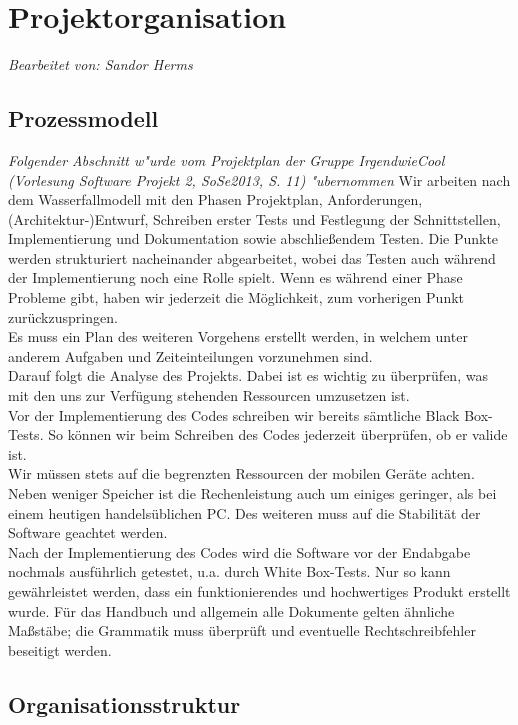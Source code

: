 \section{Projektorganisation}
\textit{Bearbeitet von: Sandor Herms}
\subsection{Prozessmodell}
\textit{Folgender Abschnitt w"urde vom Projektplan der Gruppe IrgendwieCool (Vorlesung Software Projekt 2, SoSe2013, S. 11) "ubernommen}
Wir arbeiten nach dem Wasserfallmodell mit den Phasen Projektplan, Anforderungen, (Architektur-)Entwurf, Schreiben erster Tests und Festlegung der Schnittstellen, Implementierung und Dokumentation sowie abschließendem Testen. Die Punkte werden strukturiert nacheinander abgearbeitet, wobei das Testen auch während der Implementierung noch eine Rolle spielt. Wenn es während einer Phase Probleme gibt, haben wir jederzeit die Möglichkeit, zum vorherigen Punkt zurückzuspringen.\\
Es muss ein Plan des weiteren Vorgehens erstellt werden, in welchem unter anderem Aufgaben und Zeiteinteilungen vorzunehmen sind.\\
Darauf folgt die Analyse des Projekts. Dabei ist es wichtig zu überprüfen, was mit den uns zur Verfügung stehenden Ressourcen umzusetzen ist.\\
Vor der Implementierung des Codes schreiben wir bereits sämtliche Black Box-Tests. So können wir beim Schreiben des Codes jederzeit überprüfen, ob er valide ist.\\
Wir müssen stets auf die begrenzten Ressourcen der mobilen Geräte achten. Neben weniger Speicher ist die Rechenleistung auch um einiges geringer, als bei einem heutigen handelsüblichen PC. Des weiteren muss auf die Stabilität der Software geachtet werden.\\
Nach der Implementierung des Codes wird die Software vor der Endabgabe nochmals ausführlich getestet, u.a. durch White Box-Tests. Nur so kann gewährleistet werden, dass ein funktionierendes und hochwertiges Produkt erstellt wurde. Für das Handbuch und allgemein alle Dokumente gelten ähnliche Maßstäbe; die Grammatik muss überprüft und eventuelle Rechtschreibfehler beseitigt werden.

\subsection{Organisationsstruktur}

